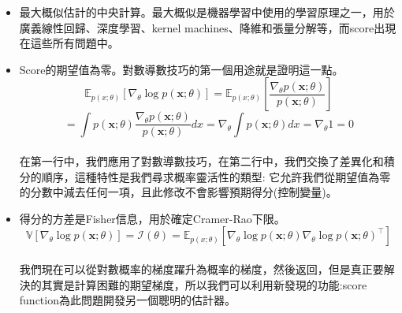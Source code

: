 \documentclass[14pt,a4paper]{report}  %
\begin{document}
\begin{itemize}
\item 最大概似估計的中央計算。最大概似是機器學習中使用的學習原理之一，用於廣義線性回歸、深度學習、kernel machines、降維和張量分解等，而score出現在這些所有問題中。
\end{itemize}
\begin{itemize}
\item  Score的期望值為零。對數導數技巧的第一個用途就是證明這一點。\\
$$\mathbb{E}_{p(x; \theta)}[\nabla_\theta \log p(\mathbf{x}; \theta)] =\mathbb{E}_{p(x; \theta)}\left[\frac{\nabla_\theta p(\mathbf {x}; \theta)}{p(\mathbf{x}; \theta)} \right]$$
$$= \int p(\mathbf {x}; \theta) \frac{\nabla_\theta p(\mathbf {x}; \theta)}{p(\mathbf{x}; \theta)} dx= \nabla_\theta \int p(\mathbf{x}; \theta) dx=\nabla_\theta 1 = 0$$\\
\qquad 在第一行中，我們應用了對數導數技巧，在第二行中，我們交換了差異化和積分的順序，這種特性是我們尋求概率靈活性的類型:  它允許我們從期望值為零的分數中減去任何一項，且此修改不會影響預期得分(控制變量)。
\end{itemize}
\begin{itemize}
\item 得分的方差是Fisher信息，用於確定Cramer-Rao下限。\\
$$\mathbb{V}[\nabla_\theta \log p(\mathbf{x}; \theta)] = \mathcal{I}(\theta) =\mathbb{E}_{p(x; \theta)}[\nabla_\theta \log p(\mathbf{x}; \theta)\nabla_\theta \log p(\mathbf{x}; \theta)^\top]$$\\
我們現在可以從對數概率的梯度躍升為概率的梯度，然後返回，但是真正要解決的其實是計算困難的期望梯度，所以我們可以利用新發現的功能:score function為此問題開發另一個聰明的估計器。
\end{itemize}
\end{document}
